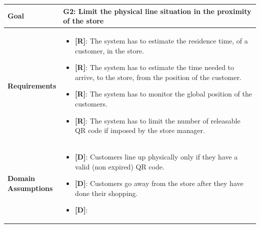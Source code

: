\begin{table}[H]
\centering
\begin{tabular}{| m{} | m{} |} 
	\hline
	\textbf{Goal} &
		\textbf{G2: Limit the physical line situation in the proximity of the store} \\
	\hline
	\textbf{Requirements} &
		\begin{itemize}
			\item {\textbf{[R]}}: The system has to estimate the residence time, of a customer, in the store.
			\item {\textbf{[R]}}: The system has to estimate the time needed to arrive, to the store, from the position of the customer.
			\item {\textbf{[R]}}: The system has to monitor the global position of the customers.
			\item {\textbf{[R]}}: The system has to limit the number of releasable QR code if imposed by the store manager.
		\end{itemize} \\ 
	\hline
	\shortstack[l]{\textbf{Domain} \\ \textbf{Assumptions}} & 
		\begin{itemize}
			\item {\textbf{[D]}}: Customers line up physically only if they have a valid (non expired) QR code.
			\item {\textbf{[D]}}: Customers go away from the store after they have done their shopping.
			\item {\textbf{[D]}}:
		\end{itemize} \\ 
	\hline
\end{tabular}
\end{table}

